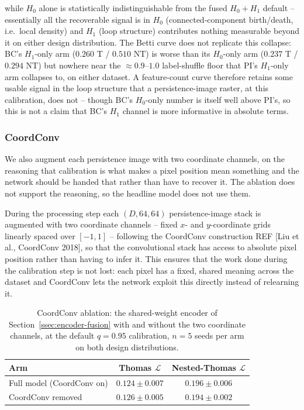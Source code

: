 \documentclass[11pt,letterpaper]{article}
\newcommand{\1}{\mathds{1}}
\theoremstyle{plain}
\theoremstyle{definitioncolon}
\begin{document}
while $H_0$ alone is statistically indistinguishable from the fused
$H_0{+}H_1$ default -- essentially all the recoverable signal is in $H_0$
(connected-component birth/death, i.e.\ local density) and $H_1$ (loop
structure) contributes nothing measurable beyond it on either design
distribution. The Betti curve does not replicate this collapse: BC's
$H_1$-only arm ($0.260$ T / $0.510$ NT) is worse than its $H_0$-only arm
($0.237$ T / $0.294$ NT) but nowhere near the $\approx\!0.9$--$1.0$
label-shuffle floor that PI's $H_1$-only arm collapses to, on either
dataset. A feature-count curve therefore retains some usable signal in the
loop structure that a persistence-image raster, at this calibration, does
not -- though BC's $H_0$-only number is itself well above PI's, so this is
not a claim that BC's $H_1$ channel is more informative in absolute terms.

\subsubsection{CoordConv}
\label{ssec:branch-coordconv}

We also augment each persistence image with two coordinate channels, on the
reasoning that calibration is what makes a pixel position mean something and the
network should be handed that rather than have to recover it. The ablation does
not support the reasoning, so the headline model does not use them.

During the processing step each $(D, 64, 64)$ persistence-image
stack is augmented with two coordinate channels -- fixed $x$- and
$y$-coordinate grids linearly spaced over $[-1, 1]$ -- following the CoordConv
construction REF [Liu et al., CoordConv 2018], so that the convolutional stack has access
to absolute pixel position rather than having to infer it. This ensures that the work
done during the calibration step is not lost: each pixel has a fixed,
shared meaning across the dataset and CoordConv lets the network exploit this
directly instead of relearning it.

\begin{table}[tbp]
\centering
\small
\begin{tabular}{lcc}
\toprule
Arm & Thomas $\mathcal{L}$ & Nested-Thomas $\mathcal{L}$ \\
\midrule
Full model (CoordConv on) & $0.124 \pm 0.007$ & $0.196 \pm 0.006$ \\
CoordConv removed & $0.126 \pm 0.005$ & $0.194 \pm 0.002$ \\
\bottomrule
\end{tabular}
\caption{CoordConv ablation: the shared-weight encoder of
Section~\ref{ssec:encoder-fusion} with and without the two coordinate
channels, at the default $q=0.95$ calibration, $n=5$ seeds per arm on both
design distributions.}
\label{tab:coordconv-ablation}
\end{table}
\end{document}

